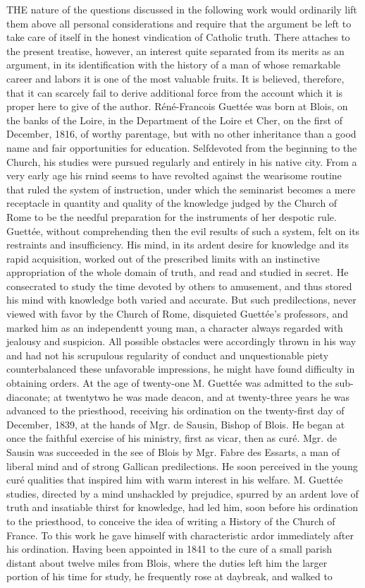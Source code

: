 THE nature of the questions discussed in the following work would ordinarily lift them above all personal considerations and require that the argument be left to take care of itself in the honest vindication of Catholic truth. There attaches to the present treatise, however, an interest quite separated from its merits as an argument, in its identification with the history of a man of whose remarkable career and labors it is one of the most valuable fruits. It is believed, therefore, that it can scarcely fail to derive additional force from the account which it is proper here to give of the author. Réné-Francois Guettée was born at Blois, on the banks of the Loire, in the Department of the Loire et Cher, on the first of December, 1816, of worthy parentage, but with no other inheritance than a good name and fair opportunities for education. Selfdevoted from the beginning to the Church, his studies were pursued regularly and entirely in his native city. From a very early age his rnind seems to have revolted against the wearisome routine that ruled the system of instruction, under which the seminarist becomes a mere receptacle in quantity and quality of the knowledge judged by the Church of Rome to be the needful preparation for the instruments of her despotic rule. Guettée, without comprehending then the evil results of such a system, felt on its restraints and insufficiency. His mind, in its ardent desire for knowledge and its rapid acquisition, worked out of the prescribed limits with an instinctive appropriation of the whole domain of truth, and read and studied in secret. He consecrated to study the time devoted by others to amusement, and thus stored his mind with knowledge both varied and accurate. But such predilections, never viewed with favor by the Church of Rome, disquieted Guettée’s professors, and marked him as an independentt young man, a character always regarded with jealousy and suspicion. All possible obstacles were accordingly thrown in his way and had not his scrupulous regularity of conduct and unquestionable piety counterbalanced these unfavorable impressions, he might have found difficulty in obtaining orders. At the age of twenty-one M. Guettée was admitted to the sub-diaconate; at twentytwo he was made deacon, and at twenty-three years he was advanced to the priesthood, receiving his ordination on the twenty-first day of December, 1839, at the hands of Mgr. de Sausin, Bishop of Blois. He began at once the faithful exercise of his ministry, first as vicar, then as curé. Mgr. de Sausin was succeeded in the see of Blois by Mgr. Fabre des Essarts, a man of liberal mind and of strong Gallican predilections. He soon perceived in the young curé qualities that inspired him with warm interest in his welfare. M. Guettée studies, directed by a mind unshackled by prejudice, spurred by an ardent love of truth and insatiable thirst for knowledge, had led him, soon before his ordination to the priesthood, to conceive the idea of writing a History of the Church of France. To this work he gave himself with characteristic ardor immediately after his ordination. Having been appointed in 1841 to the cure of a small parish distant about twelve miles from Blois, where the duties left him the larger portion of his time for study, he frequently rose at daybreak, and walked to 